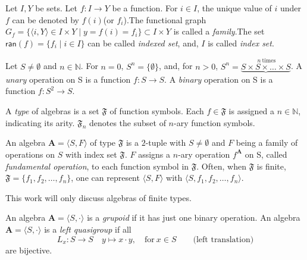 \documentclass{mcom-l}
\begin{document}
\begin{definition}
\cite{bourbaki2013theory} %
Let $I,Y$ be sets. Let $f : I \to Y$ be a function.\newline
For $i \in I$, the unique value of $i$ under $f$ can be denoted by $f(i)$(or $f_i$).\newline The functional graph $G_f = \{\langle i, Y\rangle \in I \times Y \mid y = f(i) = f_i\} \subset I \times Y$ is called a \emph{family}.\newline The set $\mathsf{ran}(f)=\{ f_i \mid i \in I\}$ can be called \emph{indexed set}, and, $I$ is called \emph{index set}.

\end{definition}

\begin{definition}
Let $S \neq \emptyset$ and $n \in \mathbb{N}$.\newline
For $n=0$, $S^n = \{ \emptyset \}$, and, for $n>0$, $S^n = \underbrace{S \times S \times \dots \times S}^{~n~\text{times}}$.\newline
A \emph{unary} operation on S is a function $f : S \to S$.\newline
A \emph{binary} operation on S is a function $f : S^2 \to S$.
\end{definition}


\begin{definition}
\cite{burris1981course}
A \emph{type} of algebras is a set $\mathfrak{F}$ of function symbols.\newline
Each $f \in \mathfrak{F}$ is assigned a $n \in \mathbb{N}$, indicating its arity.\newline
$\mathfrak{F}_n$ denotes the subset of $n$-ary function symbols.
\end{definition}

\begin{definition}
\cite{burris1981course} %
An algebra $\mathbf{A}=\langle S,  F\rangle$  of type $\mathfrak{F}$ is a $2$-tuple with $S\neq \emptyset$ and $F$ being a family of operations on $S$ with index set $\mathfrak{F}$.
$F$ assigns a $n$-ary operation $f^{\mathbf{A}}$ on S, called \emph{fundamental operation}, to each function symbol in $\mathfrak{F}$.
Often, when $\mathfrak{F}$ is finite, $\mathfrak{F} =\{f_1, f_2, \dots, f_n\}$, one can represent $\langle S, F\rangle$ with $\langle S, f_1, f_2, \dots, f_n\rangle$.
\end{definition}
 This work will only discuss algebras of finite types.
\begin{example}
An algebra $\mathbf{A}=\langle S, \cdot \rangle$ is a \emph{grupoid} if it has just one binary operation.\newline\newline
An algebra $\mathbf{A} = \langle S, \cdot \rangle$ is a \emph{left quasigroup} if all \[L_x : S \to S \hspace{1em} y \mapsto x \cdot y, \hspace{1em} \text{for}~x\in S\hspace{2em}\text{(left translation)}\] are bijective. \cite{BonStanCommTheory2021}
\end{example}
\end{document}
